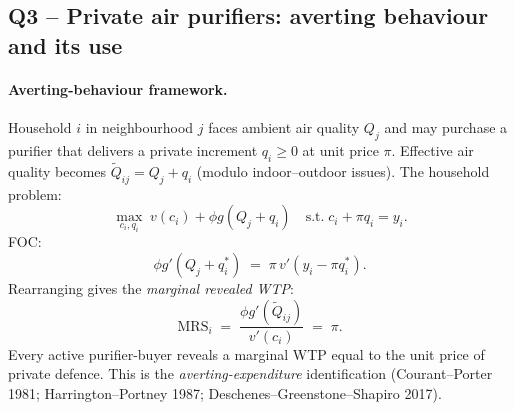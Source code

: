 \documentclass[11pt,a4paper]{article}
\begin{document}
\subsection*{Q3 -- Private air purifiers: averting behaviour and its use}

\paragraph{Averting-behaviour framework.}
Household $i$ in neighbourhood $j$ faces ambient air quality $Q_{j}$ and may purchase a purifier that delivers a private increment $q_{i}\ge 0$ at unit price $\pi$. Effective air quality becomes $\tilde Q_{ij}=Q_{j}+q_{i}$ (modulo indoor--outdoor issues). The household problem:
\begin{equation}
\max_{c_{i},q_{i}}\;v(c_{i})+\phi g(Q_{j}+q_{i})\quad\text{s.t.}\;c_{i}+\pi q_{i}=y_{i}.
\label{eq:q4_purifFOC}
\end{equation}
FOC:
\[
\phi g'(Q_{j}+q_{i}^{*})\;=\;\pi\,v'(y_{i}-\pi q_{i}^{*}).
\]
Rearranging gives the \emph{marginal revealed WTP}:
\begin{equation}
\mathrm{MRS}_{i}\;=\;\frac{\phi g'(\tilde Q_{ij})}{v'(c_{i})}\;=\;\pi.
\label{eq:q4_MRS}
\end{equation}
Every active purifier-buyer reveals a marginal WTP equal to the unit price of private defence. This is the \emph{averting-expenditure} identification (Courant--Porter 1981; Harrington--Portney 1987; Deschenes--Greenstone--Shapiro 2017).
\end{document}
